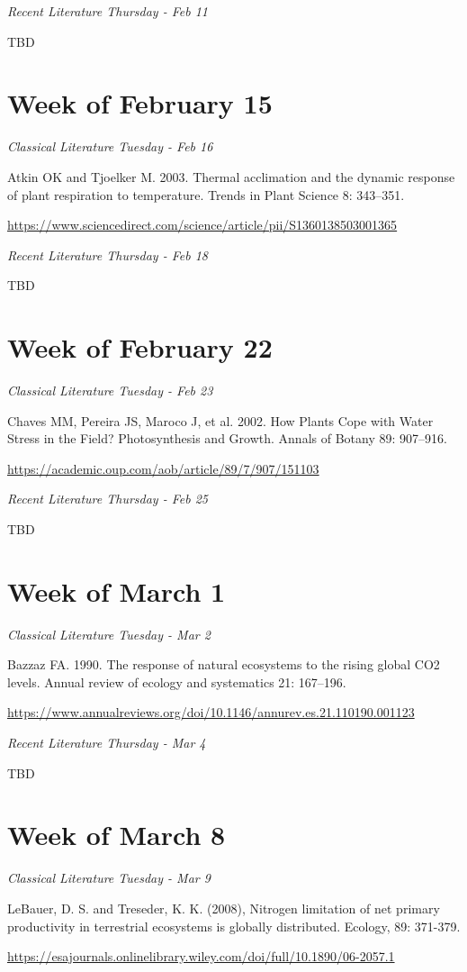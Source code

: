 \documentclass[12pt, notitlepage]{article}   	%
\begin{document}
{\textit{Recent Literature Thursday - Feb 11} \par
TBD \par

\section*{Week of February 15}
\textit{Classical Literature Tuesday - Feb 16} \par
Atkin OK and Tjoelker M. 2003. Thermal acclimation and the dynamic response of plant 
respiration to temperature. Trends in Plant Science 8: 343–351. \par
\url{https://www.sciencedirect.com/science/article/pii/S1360138503001365}

\textit{Recent Literature Thursday - Feb 18} \par
TBD \par

\section*{Week of February 22}
\textit{Classical Literature Tuesday - Feb 23} \par
Chaves MM, Pereira JS, Maroco J, et al. 2002. How Plants Cope with Water Stress 
in the Field? Photosynthesis and Growth. Annals of Botany 89: 907–916. \par
\url{https://academic.oup.com/aob/article/89/7/907/151103}

\textit{Recent Literature Thursday - Feb 25} \par
TBD \par

\section*{Week of March 1}
\textit{Classical Literature Tuesday - Mar 2} \par
Bazzaz FA. 1990. The response of natural ecosystems to the rising global CO2 levels. 
Annual review of ecology and systematics 21: 167–196. \par
\url{https://www.annualreviews.org/doi/10.1146/annurev.es.21.110190.001123}

\textit{Recent Literature Thursday - Mar 4} \par
TBD \par

\section*{Week of March 8}
\textit{Classical Literature Tuesday - Mar 9} \par
LeBauer, D. S. and Treseder, K. K. (2008), Nitrogen limitation of net primary productivity
in terrestrial ecosystems is globally distributed. Ecology, 89: 371-379. \par
\url{https://esajournals.onlinelibrary.wiley.com/doi/full/10.1890/06-2057.1}

}
\end{document}
